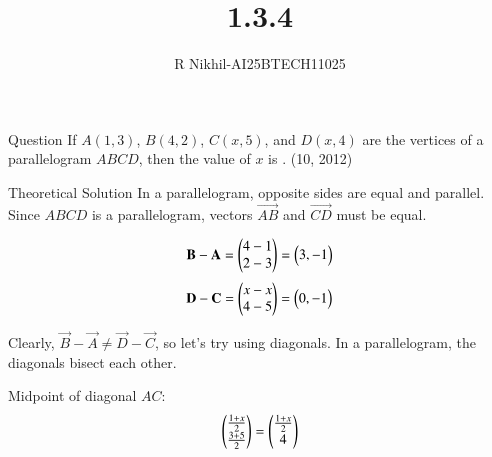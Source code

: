 \documentclass{beamer}
\title %
{1.3.4}
\author %
{R Nikhil-AI25BTECH11025}
\begin{document}
\frame{\titlepage}
\begin{frame}{Question}
If $ A(1, 3) $, $ B(4, 2) $, $ C(x, 5) $, and $ D(x, 4) $ are the vertices of a parallelogram $ABCD$, then the value of $x$ is \underline{\hspace{2cm}}. \hfill (10, 2012)
\end{frame}

\begin{frame}{Theoretical Solution}
In a parallelogram, opposite sides are equal and parallel. Since $ABCD$ is a parallelogram, vectors $ \vec{AB} $ and $ \vec{CD} $ must be equal.

\begin{align}
\mathbf{B} -\mathbf{A} = \begin{pmatrix}4 - 1\\ 2 - 3\end{pmatrix} = \begin{pmatrix}3, -1\end{pmatrix}
\end{align}
\begin{align}
\mathbf{D} - \mathbf{C} = \begin{pmatrix}x - x\\ 4 - 5\end{pmatrix} = \begin{pmatrix}0, -1\end{pmatrix}
\end{align}

	Clearly, $ \vec{B}-\vec{A} \neq \vec{D}-\vec{C} $, so let's try using diagonals. In a parallelogram, the diagonals bisect each other.

Midpoint of diagonal $AC$:
\begin{align}
\begin{pmatrix}\frac{1 + x}{2} \\ \frac{3 + 5}{2} \end{pmatrix} = \begin{pmatrix} \frac{1 + x}{2}\\ 4 \end{pmatrix}
\end{align}
\end{frame}
\end{document}
